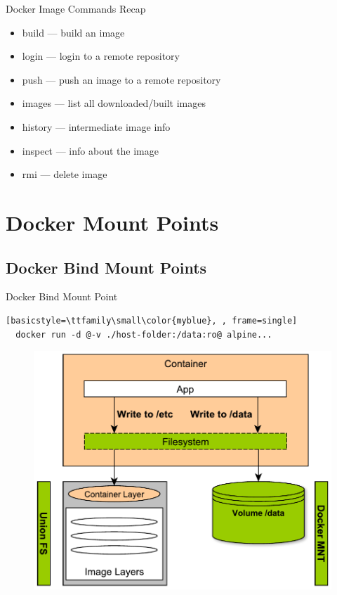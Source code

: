 \begin{frame}{Docker Image Commands Recap}
  \begin{itemize}
    \item build   --- build an image
    \item login   --- login to a remote repository
    \item push    --- push an image to a remote repository
    \item images  --- list all downloaded/built images
    \item history --- intermediate image info
    \item inspect --- info about the image
    \item rmi     --- delete image
  \end{itemize}    
\end{frame}

\section{Docker Mount Points}

\subsection{Docker Bind Mount Points}

\begin{frame}[fragile]{Docker Bind Mount Point }
  \begin{lstlisting}[basicstyle=\ttfamily\small\color{myblue}, , frame=single]
  docker run -d @-v ./host-folder:/data:ro@ alpine...
  \end{lstlisting}  
  \begin{figure}
    \includegraphics[scale=0.5]{figures/volumes.pdf}
  \end{figure}  
\end{frame}

